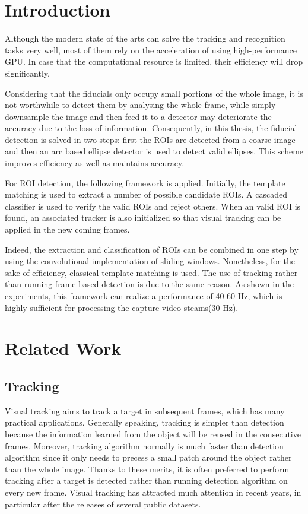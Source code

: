 \documentclass[a4paper]{report}
\begin{document}
\section{Introduction}

Although the modern state of the arts can solve the tracking and recognition tasks very well, most of them rely on the acceleration of using high-performance GPU. In case that the computational resource is limited, their efficiency will drop significantly.

Considering that the fiducials only occupy small portions of the whole image, it is not worthwhile to detect them by analysing the whole frame, while simply downsample the image and then feed it to a detector may deteriorate the accuracy due to the loss of information. Consequently, in this thesis, the fiducial detection is solved in two steps: first the ROIs are detected from a coarse image and then an arc based ellipse detector is used to detect valid ellipses. This scheme improves efficiency as well as maintains accuracy. 

For ROI detection, the following framework is applied. Initially, the template matching is used to extract a number of possible candidate ROIs. A cascaded classifier is used to verify the valid ROIs and reject others. When an valid ROI is found, an associated tracker is also initialized so that visual tracking can be applied in the new coming frames.

Indeed, the extraction and classification of ROIs can be combined in one step by using the convolutional implementation of sliding windows. Nonetheless, for the sake of efficiency, classical template matching is used. The use of tracking rather than running frame based detection is due to the same reason. As shown in the experiments, this framework can realize a performance of 40-60 Hz, which is highly sufficient for processing the capture video steams(30 Hz).



\section{Related Work}

\subsection{Tracking}
Visual tracking aims to track a target in subsequent frames, which has many practical applications. Generally speaking, tracking is simpler than detection because the information learned from the object will be reused in the consecutive frames. Moreover, tracking algorithm normally is much faster than detection algorithm since it only needs to precess a small patch around the object rather than the whole image.
Thanks to these merits, it is often preferred to perform tracking after a target is detected rather than running detection algorithm on every new frame. Visual tracking has attracted much attention in recent years, in particular after the releases of several public datasets. 
 
\end{document}
